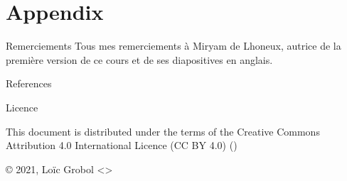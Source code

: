\documentclass[
	hyperref={unicode},
	xcolor={svgnames, table},
	aspectratio=169,
	french,
]{beamer}
\begin{document}

\hypersetup{bookmarksdepth=0}  %
\appendix
\hypersetup{bookmarksdepth=2}
\section{Appendix}

\begin{frame}{Remerciements}
	Tous mes remerciements à Miryam de Lhoneux, autrice de la première version de ce cours et de ses diapositives en anglais.

\end{frame}


\begin{frame}[allowframebreaks]{References}
	\printbibliography[heading=none]
\end{frame}

\begin{frame}{Licence}
	\begin{center}
		{\huge \ccby}
		\vfill
		This document is distributed under the terms of the Creative Commons Attribution 4.0 International Licence (CC BY 4.0) ()

		\vfill
		© 2021, Loïc Grobol <>

	\end{center}
\end{frame}
\end{document}
